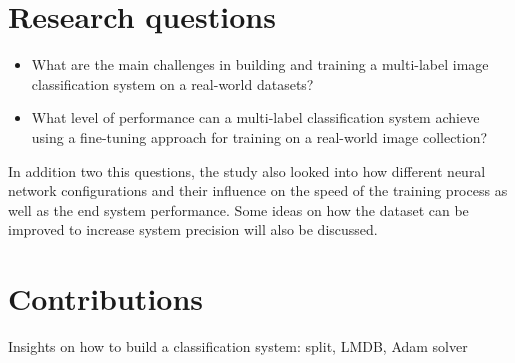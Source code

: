 \section{Research questions}

\begin{itemize}
    \item What are the main challenges in building and training a multi-label image classification system on a real-world datasets?
    \item What level of performance can a multi-label classification system achieve using a fine-tuning approach for training on a real-world image collection?
\end{itemize}

In addition two this questions, the study also looked into how different neural network configurations and their influence on the speed of the training process as well as the end system performance. Some ideas on how the dataset can be improved to increase system precision will also be discussed.

\section{Contributions}
    Insights on how to build a classification system: split, LMDB, Adam solver